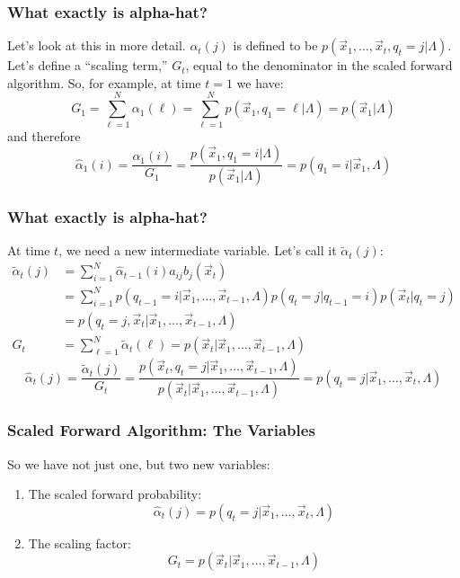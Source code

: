 \documentclass{beamer}
\begin{document}
\begin{frame}
  \frametitle{What exactly is alpha-hat?}

  Let's look at this in more detail.  $\alpha_t(j)$ is defined to be
  $p(\vec{x}_1,\ldots,\vec{x}_t,q_t=j|\Lambda)$.  Let's define a
  ``scaling term,'' $G_t$, equal to the denominator in the scaled
  forward algorithm.  So, for example, at time $t=1$ we have:
  \begin{displaymath}
  G_1 = \sum_{\ell=1}^N \alpha_1(\ell)= \sum_{\ell=1}^N p(\vec{x}_1,q_1=\ell|\Lambda)
  = p(\vec{x}_1|\Lambda)
  \end{displaymath}
  and therefore
  \begin{displaymath}
  \hat\alpha_1(i) = \frac{\alpha_1(i)}{G_1} 
  = \frac{p(\vec{x}_1,q_1=i|\Lambda)}{p(\vec{x}_1|\Lambda)}
  = p(q_1=i|\vec{x}_1,\Lambda)
  \end{displaymath}
\end{frame}

\begin{frame}
  \frametitle{What exactly is alpha-hat?}
  At time $t$, we need a new intermediate variable.  Let's call it $\tilde\alpha_t(j)$:
  \begin{align*}
  \tilde\alpha_t(j) &= \sum_{i=1}^N \hat\alpha_{t-1}(i) a_{ij}b_j(\vec{x}_t)\\
  &= \sum_{i=1}^N p(q_{t-1}=i|\vec{x}_1,\ldots,\vec{x}_{t-1},\Lambda)p(q_t=j|q_{t-1}=i)p(\vec{x}_t|q_t=j)\\
  &= p(q_{t}=j,\vec{x}_t|\vec{x}_1,\ldots,\vec{x}_{t-1},\Lambda)\\
  G_t &= \sum_{\ell=1}^N \tilde\alpha_t(\ell) = p(\vec{x}_t|\vec{x}_1,\ldots,\vec{x}_{t-1},\Lambda)
  \end{align*}
  \begin{displaymath}
  \hat\alpha_t(j) = \frac{\tilde\alpha_t(j)}{G_t}
  = \frac{p(\vec{x}_t,q_t=j|\vec{x}_1,\ldots,\vec{x}_{t-1},\Lambda)}{p(\vec{x}_t|\vec{x}_1,\ldots,\vec{x}_{t-1},\Lambda)}
  = p(q_t=j|\vec{x}_1,\ldots,\vec{x}_t,\Lambda)
  \end{displaymath}
\end{frame}

\begin{frame}
  \frametitle{Scaled Forward Algorithm: The Variables}

  So we have not just one, but two new variables:
  \begin{enumerate}
  \item The scaled forward probability:
    \begin{displaymath}
      \hat\alpha_t(j) = p(q_t=j|\vec{x}_1,\ldots,\vec{x}_{t},\Lambda)
    \end{displaymath}
  \item The scaling factor:
    \begin{displaymath}
      G_t = p(\vec{x}_t|\vec{x}_1,\ldots,\vec{x}_{t-1},\Lambda)
    \end{displaymath}
  \end{enumerate}
\end{frame}
\end{document}
